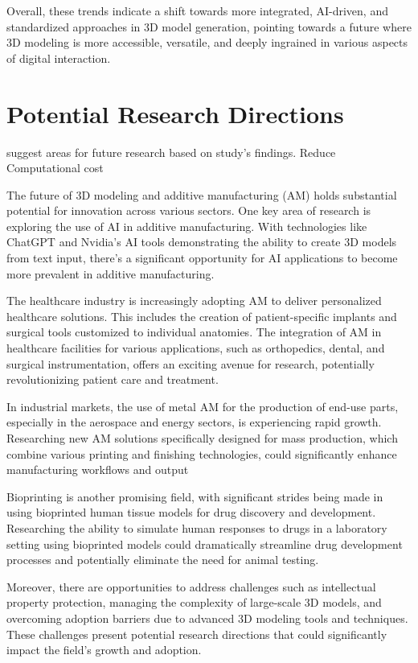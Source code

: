 Overall, these trends indicate a shift towards more integrated, AI-driven, and standardized approaches in 3D model generation, pointing towards a future where 3D modeling is more accessible, versatile, and deeply ingrained in various aspects of digital interaction.



\section{Potential Research Directions}
suggest areas for future research based on study's findings.
Reduce Computational cost

The future of 3D modeling and additive manufacturing (AM) holds substantial potential for innovation across various sectors. One key area of research is exploring the use of AI in additive manufacturing. With technologies like ChatGPT and Nvidia's AI tools demonstrating the ability to create 3D models from text input, there's a significant opportunity for AI applications to become more prevalent in additive manufacturing.

The healthcare industry is increasingly adopting AM to deliver personalized healthcare solutions. This includes the creation of patient-specific implants and surgical tools customized to individual anatomies. The integration of AM in healthcare facilities for various applications, such as orthopedics, dental, and surgical instrumentation, offers an exciting avenue for research, potentially revolutionizing patient care and treatment.

In industrial markets, the use of metal AM for the production of end-use parts, especially in the aerospace and energy sectors, is experiencing rapid growth. Researching new AM solutions specifically designed for mass production, which combine various printing and finishing technologies, could significantly enhance manufacturing workflows and output

Bioprinting is another promising field, with significant strides being made in using bioprinted human tissue models for drug discovery and development. Researching the ability to simulate human responses to drugs in a laboratory setting using bioprinted models could dramatically streamline drug development processes and potentially eliminate the need for animal testing.

Moreover, there are opportunities to address challenges such as intellectual property protection, managing the complexity of large-scale 3D models, and overcoming adoption barriers due to advanced 3D modeling tools and techniques. These challenges present potential research directions that could significantly impact the field's growth and adoption.
